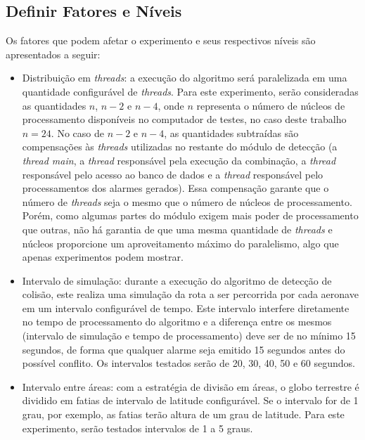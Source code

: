 \subsection{Definir Fatores e Níveis}
Os fatores que podem afetar o experimento e seus respectivos níveis são apresentados a seguir:

\begin{itemize}
    
\item Distribuição em \textit{threads}: a execução do algoritmo será paralelizada em uma quantidade configurável de \textit{threads}. Para este experimento, serão consideradas as quantidades \(n\), \(n-2\) e \(n-4\), onde \(n\) representa o número de núcleos de processamento disponíveis no computador de testes, no caso deste trabalho \(n = 24\). No caso de \(n-2\) e \(n-4\), as quantidades subtraídas são compensações às \textit{threads} utilizadas no restante do módulo de detecção (a \textit{thread main}, a \textit{thread} responsável pela execução da combinação, a \textit{thread} responsável pelo acesso ao banco de dados e a \textit{thread} responsável pelo processamentos dos alarmes gerados). Essa compensação garante que o número de \textit{threads} seja o mesmo que o número de núcleos de processamento. Porém, como algumas partes do módulo exigem mais poder de processamento que outras, não há garantia de que uma mesma quantidade de \textit{threads} e núcleos proporcione um aproveitamento máximo do paralelismo, algo que apenas experimentos podem mostrar.

\item Intervalo de simulação: durante a execução do algoritmo de detecção de colisão, este realiza uma simulação da rota a ser percorrida por cada aeronave em um intervalo configurável de tempo. Este intervalo interfere diretamente no tempo de processamento do algoritmo e a diferença entre os mesmos (intervalo de simulação e tempo de processamento) deve ser de no mínimo 15 segundos, de forma que qualquer alarme seja emitido 15 segundos antes do possível conflito. Os intervalos testados serão de 20, 30, 40, 50 e 60 segundos.

\item Intervalo entre áreas: com a estratégia de divisão em áreas, o globo terrestre é dividido em fatias de intervalo de latitude configurável. Se o intervalo for de 1 grau, por exemplo, as fatias terão altura de um grau de latitude. Para este experimento, serão testados intervalos de 1 a 5 graus.

\end{itemize}


